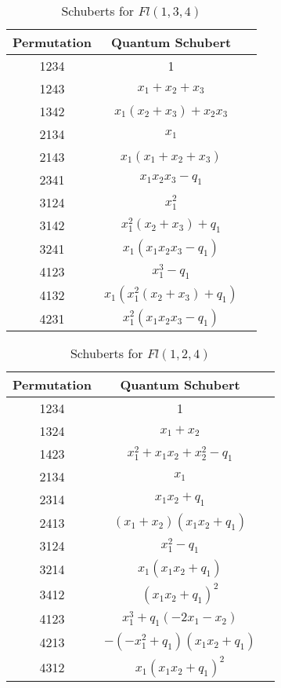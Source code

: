 \documentclass[11pt]{article}
\begin{document}
\begin{table}[!h]
\centering
\caption{Schuberts for $Fl(1, 3, 4)$}
\begin{tabular}{|c|c|p{10cm}|}
\hline
\textbf{Permutation} & \textbf{Quantum Schubert} \\ \hline
1234 & 1 \\ \hline 
1243 & $x_1 + x_2 + x_3$ \\ \hline
1342 & $x_1(x_2 + x_3) + x_2x_3$ \\ \hline
2134 & $x_1$ \\ \hline
2143 & $x_1(x_1 + x_2 + x_3)$ \\ \hline
2341 & $x_1x_2x_3 - q_1$ \\ \hline 
3124 & $x_1^2$ \\ \hline
3142 & $x_1^2(x_2 + x_3) + q_1$ \\ \hline
3241 & $x_1(x_1x_2x_3 - q_1)$ \\ \hline
4123 & $x_1^3 - q_1$ \\ \hline
4132 & $x_1(x_1^2(x_2 + x_3) + q_1)$ \\ \hline
4231 & $x_1^2(x_1x_2x_3 - q_1)$ \\ \hline
\end{tabular}
\end{table}

\begin{table}[!h]
\centering
\caption{Schuberts for $Fl(1, 2, 4)$}
\begin{tabular}{|c|c|p{10cm}|}
\hline
\textbf{Permutation} &  \textbf{Quantum Schubert} \\ \hline
1234 & 1 \\ \hline 
1324 & $x_1 + x_2$ \\ \hline
1423 & $x_1^2 + x_1x_2 + x_2^2 - q_1$ \\ \hline
2134 & $x_1$ \\ \hline
2314 & $x_1x_2 + q_1$ \\ \hline
2413 & $(x_1+x_2)(x_1x_2 + q_1)$ \\ \hline 
3124 & $x_1^2 - q_1$ \\ \hline
3214 & $x_1(x_1x_2 + q_1)$ \\ \hline
3412 & $(x_1x_2 + q_1)^2$ \\ \hline
4123 & $x_1^3 + q_1(-2x_1 - x_2)$ \\ \hline
4213 & $-(-x_1^2 + q_1)(x_1x_2 + q_1)$ \\ \hline
4312 & $x_1(x_1x_2 + q_1)^2$ \\ \hline
\end{tabular}
\end{table}
\end{document}
